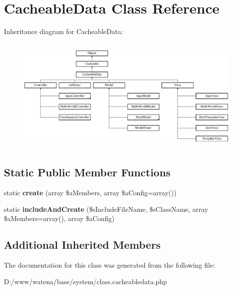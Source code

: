 \hypertarget{class_cacheable_data}{\section{Cacheable\-Data Class Reference}
\label{class_cacheable_data}
}
Inheritance diagram for Cacheable\-Data\-:\begin{figure}[H]
\begin{center}
\leavevmode
\includegraphics[height=5.753425cm]{class_cacheable_data}
\end{center}
\end{figure}
\subsection*{Static Public Member Functions}
\begin{DoxyCompactItemize}
\item 
\hypertarget{class_cacheable_data_afbb7ac6abfe96347fac38e9cbcef643d}{static {\bfseries create} (array \$a\-Members, array \$a\-Config=array())}\label{class_cacheable_data_afbb7ac6abfe96347fac38e9cbcef643d}

\item 
\hypertarget{class_cacheable_data_aa5d8199804f4ef00bacd5831073ba4af}{static {\bfseries include\-And\-Create} (\$s\-Include\-File\-Name, \$s\-Class\-Name, array \$a\-Members=array(), array \$a\-Config)}\label{class_cacheable_data_aa5d8199804f4ef00bacd5831073ba4af}

\end{DoxyCompactItemize}
\subsection*{Additional Inherited Members}


The documentation for this class was generated from the following file\-:\begin{DoxyCompactItemize}
\item 
D\-:/www/watena/base/system/class.\-cacheabledata.\-php\end{DoxyCompactItemize}
